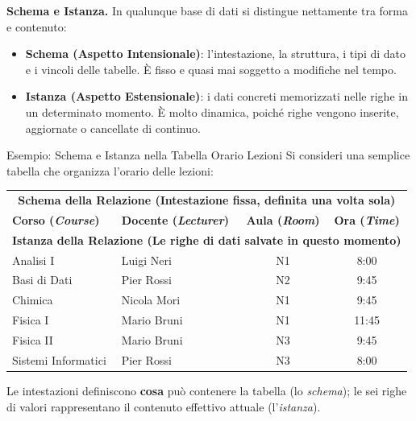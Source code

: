 \documentclass[12pt]{extarticle}
\begin{document}
\medskip
\noindent \textbf{Schema e Istanza.} In qualunque base di dati si distingue nettamente tra forma e contenuto:
\begin{itemize}
    \item \textbf{Schema (Aspetto Intensionale)}: l'intestazione, la struttura, i tipi di dato e i vincoli delle tabelle. È fisso e quasi mai soggetto a modifiche nel tempo.
    \item \textbf{Istanza (Aspetto Estensionale)}: i dati concreti memorizzati nelle righe in un determinato momento. È molto dinamica, poiché righe vengono inserite, aggiornate o cancellate di continuo.
\end{itemize}

\begin{cbox}{Esempio: Schema e Istanza nella Tabella Orario Lezioni}
\noindent Si consideri una semplice tabella che organizza l'orario delle lezioni:
\begin{center}
\small
\begin{tabular}{llcc}
    \toprule
    \multicolumn{4}{c}{\textbf{Schema della Relazione (Intestazione fissa, definita una volta sola)}} \\
    \textbf{Corso (\textit{Course})} & \textbf{Docente (\textit{Lecturer})} & \textbf{Aula (\textit{Room})} & \textbf{Ora (\textit{Time})} \\
    \midrule
    \multicolumn{4}{c}{\textbf{Istanza della Relazione (Le righe di dati salvate in questo momento)}} \\
    Analisi I & Luigi Neri & N1 & 8:00 \\
    Basi di Dati & Pier Rossi & N2 & 9:45 \\
    Chimica & Nicola Mori & N1 & 9:45 \\
    Fisica I & Mario Bruni & N1 & 11:45 \\
    Fisica II & Mario Bruni & N3 & 9:45 \\
    Sistemi Informatici & Pier Rossi & N3 & 8:00 \\
    \bottomrule
\end{tabular}
\end{center}
\medskip
\noindent Le intestazioni definiscono \textbf{cosa} può contenere la tabella (lo \textit{schema}); le sei righe di valori rappresentano il contenuto effettivo attuale (l'\textit{istanza}).
\end{cbox}
\end{document}
